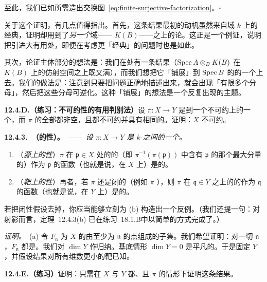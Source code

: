 至此，我们已如所需造出交换图~\eqref{eq:finite-surjective-factorization}。\hfill$\square$

关于这个证明，有几点值得指出。首先，这条结果最初的动机虽然来自域 $k$ 上的经典\trVariety，证明却用到了\emph{另一个}域——\trFunctionField{} $K(B)$——之上的\trVariety{}论。这正是一个例证，说明把\trGenericPoint{}引进\trAlgebraicGeometry{}大有用处，即便在考虑更「经典」的问题时也是如此。

其次，论证主体部分的想法是：我们在\trGenericPoint{}处有一条结果（$\operatorname{Spec} A\otimes_B K(B)$ 在 $K(B)$ 上的仿射空间之上既\trFinite{}又满），而我们想把它「铺展」到 $\operatorname{Spec} B$ 的\trGenericPoint{}的一个\trOpen\trNeighborhood{}上去。我们的做法是：注意到只要把问题正确地描述出来，就会出现「有限多个分母」，然后把这些分母可逆化。这种「铺展」的想法是一个反复出现的主题。

\textbf{12.4.D.（练习：不可约性的有用判别法）}\quad 设 $\pi\colon X\to Y$ 是到一个不可约\trVariety{}上的一个\trProper{}\trMorphism，而 $\pi$ 的全部\trFiber{}都非空，且都不可约并具有相同的\trDimension。证明：$X$ 不可约。

\textbf{12.4.3.\ \trhTheorem{}（\trFiber\trDimension{}的\trUpperSemicontinuous{}性）。}\ ——\ \emph{设 $\pi\colon X\to Y$ 是\trFiniteType{} $k$-\trScheme{}之间的一个\trMorphism。}
\begin{enumerate}[label=(\alph*)]
\item （\emph{源上的\trUpperSemicontinuous{}性}）$\pi$ 在 $\mathfrak{p}\in X$ 处的\trFiber{}的\trDimension{}（即 $\pi^{-1}(\pi(\mathfrak{p}))$ 中含有 $\mathfrak{p}$ 的那个最大分量的\trDimension）作为 $\mathfrak{p}$ 的函数（也就是说，在 $X$ 上）是\trUpperSemicontinuous{}的。
\item （\emph{靶上的\trUpperSemicontinuous{}性}）再者，若 $\pi$ 还是闭的（例如 $\pi$ \trProper），则 $\pi$ 在 $\mathfrak{q}\in Y$ 之上的\trFiber{}的\trDimension{}作为 $\mathfrak{q}$ 的函数（也就是说，在 $Y$ 上）是\trUpperSemicontinuous{}的。
\end{enumerate}
若把闭性假设去掉，你应当能够立刻为 (b) 构造出一个反例。（我们还提一句：对射影\trMorphism{}而言，定理~12.4.3(b) 已在\mbox{练习~18.1.B}中以简单的方式完成了。）

\emph{证明。}\ (a) 令 $F_{\mathfrak{n}}$ 为 $X$ 的由\trFiber\trDimension{}至少为 $\mathfrak{n}$ 的点组成的子集。我们希望证明：对一切 $\mathfrak{n}$，$F_{\mathfrak{n}}$ 都是\trClosedSubset。我们对 $\dim Y$ 作归纳。基底情形 $\dim Y=0$ 是平凡的。于是固定 $Y$，并假设结果对所有维数更小的靶已知。

\textbf{12.4.E.（练习）}\quad 证明：只需在 $X$ 与 $Y$ 都\trIntegral、且 $\pi$ \trDominant{}的情形下证明这条结果。

